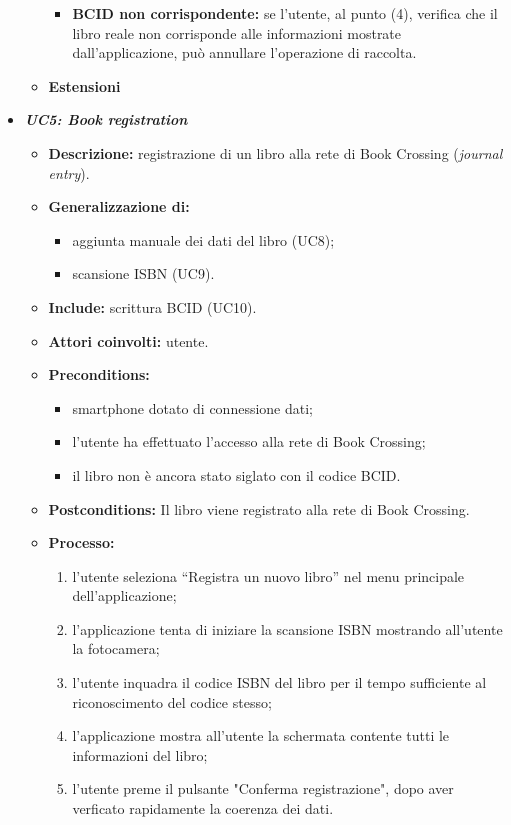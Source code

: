 \begin{itemize}
\begin{itemize}
\begin{itemize}
			\item \textbf{BCID non corrispondente:} se l'utente, al punto (4), verifica che il libro reale non corrisponde alle informazioni mostrate dall'applicazione, può annullare l'operazione di raccolta.
		\end{itemize}
		\item \textbf{Estensioni}
	\end{itemize}
	\item \textbf{\textit{UC5: Book registration}} \label{itemize:UC5}
	\begin{itemize}
		\item \textbf{Descrizione:} registrazione di un libro alla rete di Book Crossing (\textit{journal entry}).
		\item \textbf{Generalizzazione di:} 
		\begin{itemize}
			\item aggiunta manuale dei dati del libro (UC8);
			\item scansione ISBN (UC9).
		\end{itemize}
		\item \textbf{Include:} scrittura BCID (UC10).
		\item \textbf{Attori coinvolti:} utente.
		\item \textbf{Preconditions:}
		\begin{itemize}
			\item smartphone dotato di connessione dati;
			\item l’utente ha effettuato l’accesso alla rete di Book Crossing;
			\item il libro non è ancora stato siglato con il codice BCID.
		\end{itemize}
		\item \textbf{Postconditions:} Il libro viene registrato alla rete di Book Crossing.		
		\item \textbf{Processo:} 
		\begin{enumerate}
			\item l’utente seleziona “Registra un nuovo libro” nel menu principale dell’applicazione;
			\item l’applicazione tenta di iniziare la scansione ISBN mostrando all'utente la fotocamera;
			\item l’utente inquadra il codice ISBN del libro per il tempo sufficiente al riconoscimento del codice stesso;
			\item l’applicazione mostra all'utente la schermata contente tutti le informazioni del libro; 
			\item l'utente preme il pulsante "Conferma registrazione", dopo aver verficato rapidamente la coerenza dei dati.

\end{enumerate}
\end{itemize}
\end{itemize}
